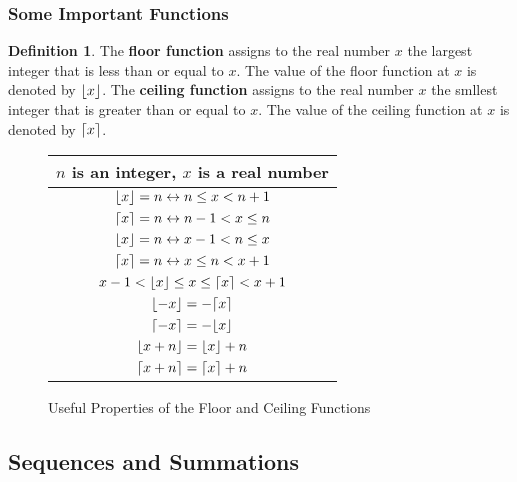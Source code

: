 \documentclass[article, 11pt]{article}
\theoremstyle{definition}
\newtheorem{definition}{Definition}[subsubsection]
\newcommand{\lra}{\leftrightarrow} %
\DeclarePairedDelimiter\ceil{\lceil}{\rceil} %
\DeclarePairedDelimiter\floor{\lfloor}{\rfloor} %
\begin{document}
    \subsubsection{Some Important Functions}
    \begin{definition}
        The \textbf{floor function} assigns to the real number $x$ the largest integer that is less than or equal to $x$. The value of the floor function at $x$ is denoted by $\floor*{x}$. The \textbf{ceiling function} assigns to the real number $x$ the smllest integer that is greater than or equal to $x$. The value of the ceiling function at $x$ is denoted by $\ceil*{x}$.
    \end{definition}
    \begin{figure}[H]
        \centering
        {\renewcommand{\arraystretch}{1.3}
        \begin{tabular}{|c|}
            \hline
            \textbf{$n$ is an integer, $x$ is a real number} \\
            \hline
            $\floor*{x} = n \lra n \leq x < n+1$ \\
            $\ceil*{x} = n \lra n-1 < x \leq n$ \\
            $\floor*{x} = n \lra x-1 < n \leq x$ \\
            $\ceil*{x} = n \lra x \leq n < x+1$ \\
            \hline
            $x-1 < \floor*{x} \leq x \leq \ceil*{x} < x+1$ \\
            \hline
            $\floor*{-x} = -\ceil*{x}$ \\
            $\ceil*{-x} = -\floor*{x}$ \\
            \hline
            $\floor*{x+n} = \floor*{x} + n$ \\
            $\ceil*{x+n} = \ceil*{x} + n$ \\
            \hline
        \end{tabular}}
        \caption{Useful Properties of the Floor and Ceiling Functions}
    \end{figure}
    \subsection{Sequences and Summations}
\end{document}
